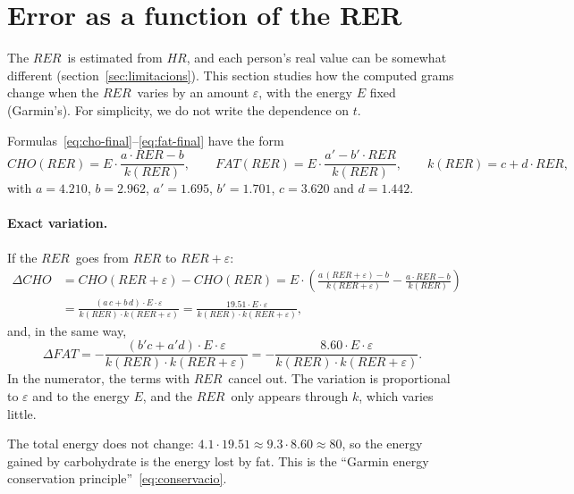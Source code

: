 \documentclass[10pt,a4paper]{article}
\newcommand{\cho}{\ensuremath{\mathit{CHO}}}               %
\newcommand{\fat}{\ensuremath{\mathit{FAT}}}
\newcommand{\RER}{\ensuremath{\mathit{RER}}}
\newcommand{\FC}{\ensuremath{\mathit{HR}}}
\begin{document}
\section{Error as a function of the RER}\label{sec:sensibilitat}

The \RER\ is estimated from \FC, and each person's real value can be somewhat different
(section~\ref{sec:limitacions}). This section studies how the computed grams change when
the \RER\ varies by an amount $\varepsilon$, with the energy $E$ fixed (Garmin's). For
simplicity, we do not write the dependence on $t$.

Formulas~\eqref{eq:cho-final}--\eqref{eq:fat-final} have the form
\[
  \cho(\RER)=E\cdot\frac{a\cdot\RER-b}{k(\RER)},\qquad
  \fat(\RER)=E\cdot\frac{a'-b'\cdot\RER}{k(\RER)},\qquad
  k(\RER)=c+d\cdot\RER,
\]
with $a=4.210$, $b=2.962$, $a'=1.695$, $b'=1.701$, $c=3.620$ and $d=1.442$.

\paragraph{Exact variation.} If the \RER\ goes from $\RER$ to $\RER+\varepsilon$:
\begin{equation}
\begin{aligned}
  \Delta\cho&=\cho(\RER+\varepsilon)-\cho(\RER)
  =E\cdot\left(\frac{a\,(\RER+\varepsilon)-b}{k(\RER+\varepsilon)}-\frac{a\cdot\RER-b}{k(\RER)}\right)\\[4pt]
  &=\frac{(a\,c+b\,d)\cdot E\cdot\varepsilon}{k(\RER)\cdot k(\RER+\varepsilon)}
  =\frac{19.51\cdot E\cdot\varepsilon}{k(\RER)\cdot k(\RER+\varepsilon)} ,
\end{aligned}
\label{eq:dcho}
\end{equation}
and, in the same way,
\begin{equation}
  \Delta\fat=-\frac{(b'c+a'd)\cdot E\cdot\varepsilon}{k(\RER)\cdot k(\RER+\varepsilon)}
  =-\frac{8.60\cdot E\cdot\varepsilon}{k(\RER)\cdot k(\RER+\varepsilon)} .
\label{eq:dfat}
\end{equation}
In the numerator, the terms with \RER\ cancel out. The variation is proportional to
$\varepsilon$ and to the energy $E$, and the \RER\ only appears through $k$, which varies
little.

The total energy does not change: $4.1\cdot19.51\approx9.3\cdot8.60\approx80$, so the
energy gained by carbohydrate is the energy lost by fat. This is the ``Garmin energy
conservation principle''~\eqref{eq:conservacio}.
\end{document}
